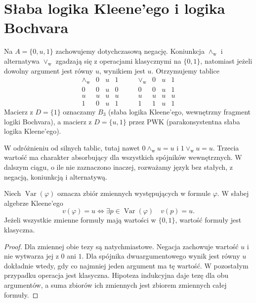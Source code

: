 \section{Słaba logika Kleene'ego i logika Bochvara}
\begin{definicja}
\label{def:ncl-weak-kleene}
Na $A=\{0,u,1\}$ zachowujemy dotychczasową negację.
Koniunkcja $\wedge_{\mathrm w}$ i alternatywa
$\vee_{\mathrm w}$ zgadzają się z operacjami
klasycznymi na $\{0,1\}$, natomiast jeżeli dowolny
argument jest równy $u$, wynikiem jest $u$.
Otrzymujemy tablice
\[
\begin{array}{c|ccc}
 \wedge_{\mathrm w}&0&u&1\\\hline
 0&0&u&0\\u&u&u&u\\1&0&u&1
\end{array}
\qquad
\begin{array}{c|ccc}
 \vee_{\mathrm w}&0&u&1\\\hline
 0&0&u&1\\u&u&u&u\\1&1&u&1
\end{array}
\]
Macierz z $D=\{1\}$ oznaczamy $B_3$ (słaba logika
Kleene'ego, wewnętrzny fragment logiki Bochvara),
a macierz z $D=\{u,1\}$ przez $\mathrm{PWK}$
(parakonsystentna słaba logika Kleene'ego).
\end{definicja}
W odróżnieniu od silnych tablic, tutaj nawet
$0\wedge_{\mathrm w}u=u$ i $1\vee_{\mathrm w}u=u$.
Trzecia wartość ma charakter absorbujący
dla wszystkich spójników wewnętrznych.
W dalszym ciągu, o ile nie zaznaczono inaczej,
rozważamy język bez stałych, z negacją,
koniunkcją i alternatywą.

\begin{lemat}
\label{lem:ncl-weak-kleene-infection}
Niech $\operatorname{Var}(\varphi)$ oznacza zbiór
zmiennych występujących w formule $\varphi$.
W słabej algebrze Kleene'ego
\[
 v(\varphi)=u
 \iff \exists p\in\operatorname{Var}(\varphi)
       \quad v(p)=u.
\]
Jeżeli wszystkie zmienne formuły mają wartości
w $\{0,1\}$, wartość formuły jest klasyczna.
\end{lemat}
\begin{proof}
Dla zmiennej obie tezy są natychmiastowe.
Negacja zachowuje wartość $u$ i nie wytwarza jej
z $0$ ani $1$. Dla spójnika dwuargumentowego
wynik jest równy $u$ dokładnie wtedy, gdy co
najmniej jeden argument ma tę wartość.
W pozostałym przypadku operacja jest klasyczna.
Hipoteza indukcyjna daje tezę dla obu argumentów,
a suma zbiorów ich zmiennych jest zbiorem
zmiennych całej formuły.
\end{proof}


